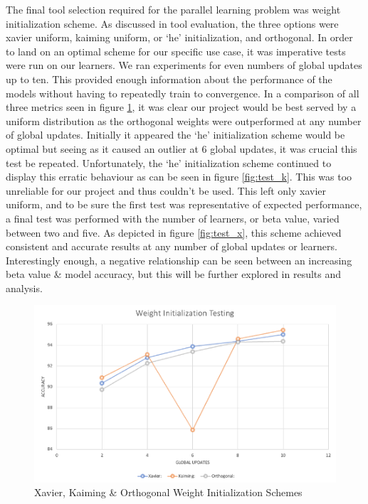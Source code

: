 \documentclass[../mthe-493-final-project.tex]{subfiles}
\begin{document}
    The final tool selection required for the parallel learning problem was weight initialization scheme. As discussed in tool evaluation, the three options were xavier uniform, kaiming uniform, or ‘he’ initialization, and orthogonal. In order to land on an optimal scheme for our specific use case, it was imperative tests were run on our learners. We ran experiments for even numbers of global updates up to ten. This provided enough information about the performance of the models without having to repeatedly train to convergence. In a comparison of all three metrics seen in figure \ref{fig:test_3}, it was clear our project would be best served by a uniform distribution as the orthogonal weights were outperformed at any number of global updates. Initially it appeared the ‘he’ initialization scheme would be optimal but seeing as it caused an outlier at 6 global updates, it was crucial this test be repeated. Unfortunately, the ‘he’ initialization scheme continued to display this erratic behaviour as can be seen in figure \ref{fig:test_k}. This was too unreliable for our project and thus couldn’t be used. This left only xavier uniform, and to be sure the first test was representative of expected performance, a final test was performed with the number of learners, or beta value, varied between two and five. As depicted in figure \ref{fig:test_x}, this scheme achieved consistent and accurate results at any number of global updates or learners. Interestingly enough, a negative relationship can be seen between an increasing beta value \& model accuracy, but this will be further explored in results and analysis.
    
    \begin{figure}
        \centering
        \includegraphics[width=165mm]{thesis/img/tool_select_1.png}
        \caption{Xavier, Kaiming \& Orthogonal Weight Initialization Schemes}
        \label{fig:test_3}
    \end{figure}
    
\end{document}
